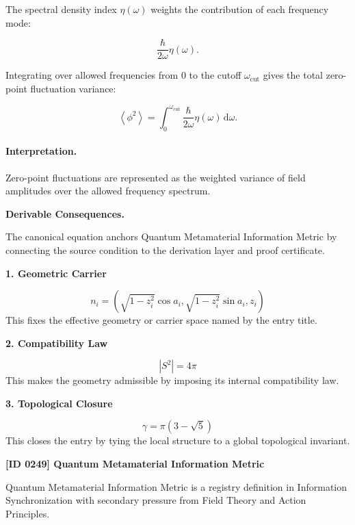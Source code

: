 The spectral density index $\eta(\omega)$ weights the contribution of each frequency mode:

\begin{equation}
\frac{\hbar}{2\omega}\eta(\omega).
\end{equation}

Integrating over allowed frequencies from $0$ to the cutoff $\omega_{\mathrm{cut}}$ gives the total zero-point fluctuation variance:

\begin{equation}
\boxed{
\left\langle\phi^2\right\rangle
=
\int_{0}^{\omega_{\mathrm{cut}}}
\frac{\hbar}{2\omega}
\eta(\omega)
\,\mathrm{d}\omega .
}
\end{equation}

\paragraph{Interpretation.}
Zero-point fluctuations are represented as the weighted variance of field amplitudes over the allowed frequency spectrum.

\par\vspace{0.35em}
\noindent\textbf{Derivable Consequences.}\quad
\begingroup
\footnotesize
\raggedright
The canonical equation anchors Quantum Metamaterial Information Metric by connecting the source condition to the derivation layer and proof certificate.
\par\endgroup

\noindent\textbf{1. Geometric Carrier}\par
\[
n_i=(\sqrt{1-z_i^2}\cos a_i,\sqrt{1-z_i^2}\sin a_i,z_i)
\]
\noindent This fixes the effective geometry or carrier space named by the entry title.\par
\noindent\textbf{2. Compatibility Law}\par
\[
|S^2|=4\pi
\]
\noindent This makes the geometry admissible by imposing its internal compatibility law.\par
\noindent\textbf{3. Topological Closure}\par
\[
\gamma=\pi(3-\sqrt{5})
\]
\noindent This closes the entry by tying the local structure to a global topological invariant.\par

\clearpage
\noindent\textbf{[ID 0249] Quantum Metamaterial Information Metric}\par
\vspace{0.35em}
\begingroup\small
{}
Quantum Metamaterial Information Metric is a registry definition in Information Synchronization with secondary pressure from Field Theory and Action Principles.

